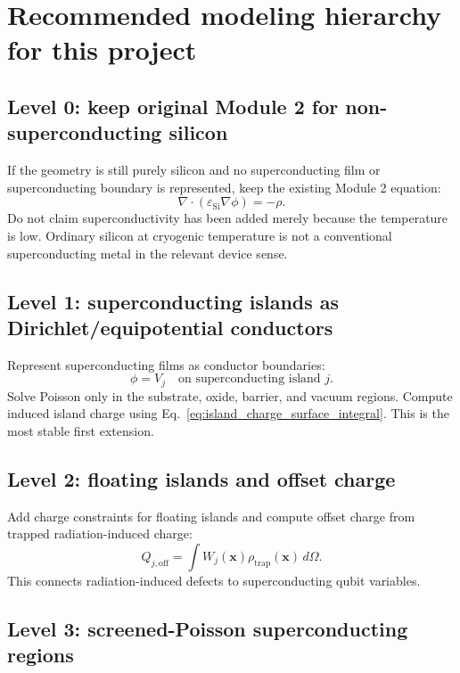 \documentclass[11pt]{article}
\begin{document}
\section{Recommended modeling hierarchy for this project}

\subsection{Level 0: keep original Module 2 for non-superconducting silicon}

If the geometry is still purely silicon and no superconducting film or superconducting boundary is represented, keep the existing Module 2 equation:
\begin{equation}
\nabla\cdot(\varepsilon_{\mathrm{Si}}\nabla\phi)=-\rho.
\end{equation}
Do not claim superconductivity has been added merely because the temperature is low. Ordinary silicon at cryogenic temperature is not a conventional superconducting metal in the relevant device sense.

\subsection{Level 1: superconducting islands as Dirichlet/equipotential conductors}

Represent superconducting films as conductor boundaries:
\begin{equation}
\phi=V_j \quad \text{on superconducting island }j.
\end{equation}
Solve Poisson only in the substrate, oxide, barrier, and vacuum regions. Compute induced island charge using Eq.~\eqref{eq:island_charge_surface_integral}. This is the most stable first extension.

\subsection{Level 2: floating islands and offset charge}

Add charge constraints for floating islands and compute offset charge from trapped radiation-induced charge:
\begin{equation}
Q_{j,\mathrm{off}}=\int W_j(\mathbf{x})\rho_{\mathrm{trap}}(\mathbf{x})\,d\Omega.
\end{equation}
This connects radiation-induced defects to superconducting qubit variables.

\subsection{Level 3: screened-Poisson superconducting regions}
\end{document}
